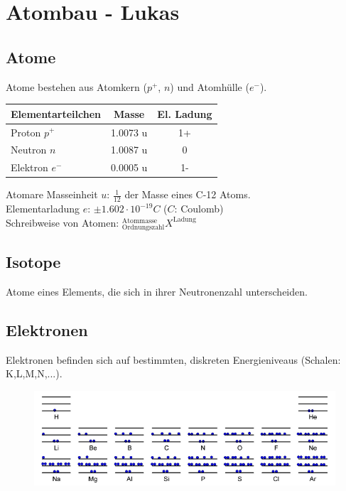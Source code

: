 \section{Atombau - Lukas}

\subsection{Atome}
Atome bestehen aus Atomkern ($p^+$, $n$) und Atomhülle ($e^-$).

\begin{table}[htbp]
	\begin{tabular}{|l|c|c|}
		Elementarteilchen & Masse & El. Ladung \\ \hline
		Proton $p^+$ & 1.0073 u & 1+ \\
		Neutron $n$ & 1.0087 u & 0 \\
		Elektron $e^-$ & 0.0005 u & 1- \\ \hline
	\end{tabular}
\end{table}

Atomare Masseinheit $u$: $\frac{1}{12}$ der Masse eines C-12 Atoms. \\

Elementarladung $e$: $\pm 1.602 \cdot 10^{-19} C$ ($C$: Coulomb) \\

Schreibweise von Atomen: $ ^\text{Atommasse}_\text{Ordnungszahl} X ^\text{Ladung}$ \\

\subsection{Isotope}
Atome eines Elements, die sich in ihrer Neutronenzahl unterscheiden.

\subsection{Elektronen}
Elektronen befinden sich auf bestimmten, diskreten Energieniveaus (Schalen: K,L,M,N,...). 

\begin{figure}[htbp]
	\centering
	\includegraphics[width=0.9\linewidth]{images/2_Energie_der_Elektronen.png}
\end{figure}

